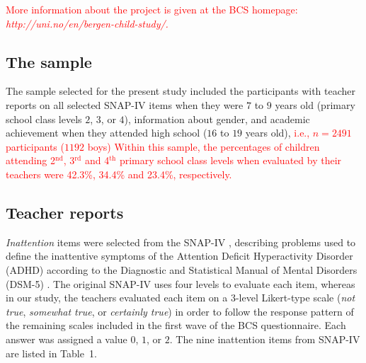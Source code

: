 \documentclass[10pt,letterpaper]{article}
\begin{document}
\textcolor{red}{More information about the project is given at the BCS homepage: {\em http://uni.no/en/bergen-child-study/.}}

\vspace{3mm}
\subsection*{The sample}
The sample selected for the present study included the participants with teacher reports on all selected SNAP-IV items when they were $7$ to $9$ years old (primary school class levels $2$, $3$, or $4$), information about gender, and academic achievement when they attended high school ($16$ to $19$ years old), \textcolor{red}{i.e., $n=2491$ participants ($1192$ boys)}
\textcolor{red}{Within this sample, the percentages of children attending 2$^{\text{nd}}$, 3$^{\text{rd}}$ and 4$^{\text{th}}$ primary school
 class levels when evaluated by their teachers were 
\textcolor{red}{42.3\%, 34.4\% and 23.4\%}, respectively.}

\vspace{3mm}
\subsection*{Teacher reports}
\emph{Inattention} items were selected from the SNAP-IV \cite{Swanson1992}, describing problems used to define the inattentive symptoms of the Attention Deficit Hyperactivity Disorder (ADHD) according to the Diagnostic and Statistical Manual of Mental Disorders (DSM-5) \cite{APA2013}. The original SNAP-IV uses four levels to evaluate each item, whereas in our study, the teachers evaluated each item on a 3-level Likert-type scale (\emph{not true}, \emph{somewhat true}, or \emph{certainly true}) in order to follow the response pattern of the remaining scales included in the first wave of the BCS questionnaire. Each answer was assigned a value $0$, $1$, or $2$. 
The  nine inattention items from SNAP-IV are listed in Table~1. 
\end{document}
